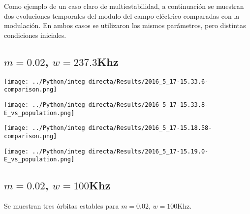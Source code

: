 		Como ejemplo de un caso claro de multiestabilidad, a continuación se muestran dos evoluciones temporales del modulo del campo eléctrico comparadas con la modulación. 
		En ambos casos se utilizaron los mismos parámetros, pero distintas condiciones iniciales.
		
		\subsection{$m=0.02$, $w=237.3$Khz}
		\begin{minipage}{0.5\textwidth}
			
			\centering
			\texttt{[image: ../Python/integ directa/Results/2016\_5\_17-15.33.6-comparison.png]}
			
		\end{minipage}
		\begin{minipage}{0.5\textwidth}
			
			\centering
			\texttt{[image: ../Python/integ directa/Results/2016\_5\_17-15.33.8-E\_vs\_population.png]}
			
		\end{minipage}
		
		
		
		\begin{minipage}{0.5\textwidth}
			
			\centering
			\texttt{[image: ../Python/integ directa/Results/2016\_5\_17-15.18.58-comparison.png]}
			
		\end{minipage}
		\begin{minipage}{0.5\textwidth}
			
			\centering
			\texttt{[image: ../Python/integ directa/Results/2016\_5\_17-15.19.0-E\_vs\_population.png]}
			
		\end{minipage}
		
		
		\subsection{$m=0.02$, $w=100$Khz}
		
		Se muestran tres órbitas estables para $m=0.02$, $w=100$Khz.
		
